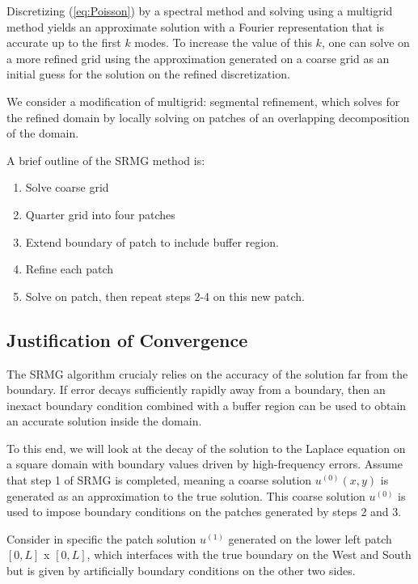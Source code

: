 \documentclass[final]{siamart1116}
\numberwithin{theorem}{section}
\begin{document}
Discretizing (\ref{eq:Poisson}) by a spectral method and solving using a multigrid method yields an approximate solution with a Fourier representation that is accurate up to the first $k$ modes. To increase the value of this $k$, one can solve on a more refined grid using the approximation generated on a coarse grid as an initial guess for the solution on the refined discretization. 

We consider a modification of multigrid: segmental refinement, which solves for the refined domain by locally solving on patches of an overlapping decomposition of the domain. 

A brief outline of the SRMG method is:

\begin{enumerate}
\item Solve coarse grid 
\item Quarter grid into four patches
\item Extend boundary of patch to include buffer region. 
\item Refine each patch
\item Solve on patch, then repeat steps 2-4 on this new patch. 
\end{enumerate}

\subsection{Justification of Convergence}\label{sec:firstanalysis}

The SRMG algorithm crucialy relies on the accuracy of the solution far from the boundary. If error decays sufficiently
rapidly away from a boundary, then an inexact boundary condition combined with a buffer region can be used to obtain an
accurate solution inside the domain. 

To this end, we will look at the decay of the solution to the Laplace equation on a square domain with boundary values driven by high-frequency errors. Assume that step 1 of SRMG is completed, meaning a coarse solution  $u^{(0)}(x, y)$ is generated as an approximation to the true solution. This coarse solution $u^{(0)}$ is used to impose boundary conditions on the patches generated by steps 2 and 3. 

Consider in specific the patch solution $u^{(1)}$ generated on the lower left patch $[0, L]$ x $[0, L]$, which interfaces with the true boundary on the West and South but is given by artificially boundary conditions  on the other two sides. 
\end{document}
